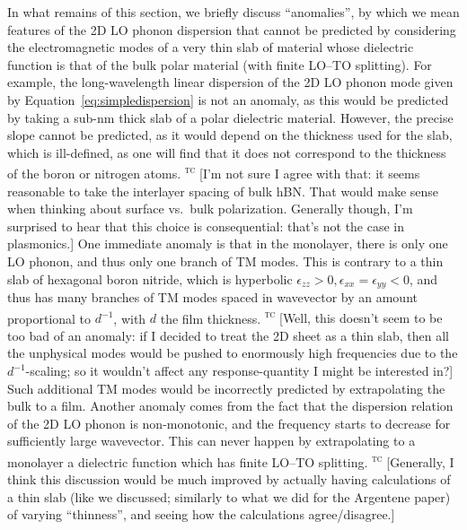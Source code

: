 \documentclass[aps,prb,twocolumn,
	           groupedaddress,superscriptaddress,
               amsfonts,amssymb,amsmath,floatfix,
	           citeautoscript]{revtex4-1}
\newcommand{\comment}[2]{%
    \ifbool{togglecomments}%
    {\textcolor{blue!70!black}{\small\textsf{%
    \textsuperscript{\textsc{\textsf{\MakeLowercase{#1}}}}%
    [#2]}}} %
    {}}     %
\begin{document}
In what remains of this section, we  briefly discuss ``anomalies'', by which we mean features of the 2D LO phonon dispersion that cannot be predicted by considering the electromagnetic modes of a very thin slab of material whose dielectric function is that of the bulk polar material (with finite LO--TO splitting). For example, the long-wavelength linear dispersion of the 2D LO phonon mode given by Equation~\eqref{eq:simpledispersion} is not an anomaly, as this would be predicted by taking a sub-nm thick slab of a polar dielectric material. However, the precise slope cannot be predicted, as it would depend on the thickness used for the slab, which is ill-defined, as one will find that it does not correspond to the thickness of the boron or nitrogen atoms. 
\comment{tc}{I'm not sure I agree with that: it seems reasonable to take the interlayer spacing of bulk hBN. That would make sense when thinking about surface vs.\ bulk polarization. Generally though, I'm surprised to hear that this choice is consequential: that's not the case in plasmonics.}
One immediate anomaly is that in the monolayer, there is only one LO phonon, and thus only one branch of TM modes. This is contrary to a thin slab of hexagonal boron nitride, which is hyperbolic $\epsilon_{zz} > 0, \epsilon_{xx} = \epsilon_{yy} < 0$, and thus has many branches of TM modes spaced in wavevector by an amount proportional to $d^{-1}$, with $d$ the film thickness.
\comment{tc}{Well, this doesn't seem to be too bad of an anomaly: if I decided to treat the 2D sheet as a thin slab, then all the unphysical modes would be pushed to enormously high frequencies due to the $d^{-1}$-scaling; so it wouldn't affect any response-quantity I might be interested in?}
Such additional TM modes would be incorrectly predicted by extrapolating the bulk to a film. Another anomaly comes from the fact that the dispersion relation of the 2D LO phonon is non-monotonic, and the frequency starts to decrease for sufficiently large wavevector. This can never happen by extrapolating to a monolayer a dielectric function which has finite LO--TO splitting. 
\comment{tc}{Generally, I think this discussion would be much improved by actually having calculations of a thin slab (like we discussed; similarly to what we did for the Argentene paper) of varying ``thinness'', and seeing how the calculations agree/disagree.}
\end{document}
